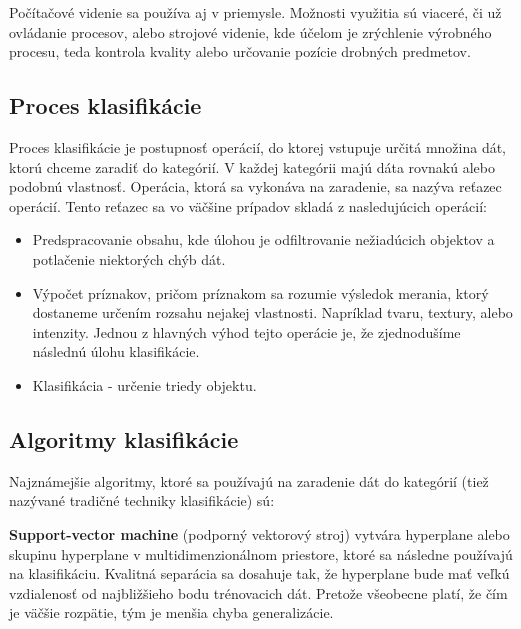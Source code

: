\hspace{10mm}Počítačové videnie sa používa aj v priemysle. Možnosti využitia sú viaceré, či už ovládanie procesov, alebo strojové videnie, kde účelom je zrýchlenie výrobného procesu, teda kontrola kvality alebo určovanie pozície drobných predmetov.\cite{Sikudova2013}  

\subsection{Proces klasifikácie}
\hspace{10mm}Proces klasifikácie je postupnosť operácií, do ktorej vstupuje určitá množina dát, ktorú chceme zaradiť do kategórií. V každej kategórii majú dáta rovnakú alebo podobnú vlastnosť. Operácia, ktorá sa vykonáva na zaradenie, sa nazýva reťazec operácií. Tento reťazec sa vo väčšine prípadov skladá z nasledujúcich operácií:

\begin{itemize}
    \item Predspracovanie obsahu, kde úlohou je odfiltrovanie nežiadúcich objektov a potlačenie niektorých chýb dát.
    \item Výpočet príznakov, pričom príznakom sa rozumie výsledok merania, ktorý dostaneme určením rozsahu nejakej vlastnosti. Napríklad tvaru, textury, alebo intenzity. Jednou z hlavných výhod tejto operácie je, že zjednodušíme následnú úlohu klasifikácie.
    \item Klasifikácia - určenie triedy objektu.
\end{itemize}
\cite{Sikudova2013} 

\subsection{Algoritmy klasifikácie}

\hspace{10mm}Najznámejšie algoritmy, ktoré sa používajú na zaradenie dát do kategórií (tiež nazývané tradičné techniky klasifikácie) sú: 

\hspace{10mm}\textbf{Support-vector machine} (podporný vektorový stroj) vytvára hyperplane alebo skupinu hyperplane v multidimenzionálnom priestore, ktoré sa následne používajú na klasifikáciu. Kvalitná separácia sa dosahuje tak, že hyperplane bude mať veľkú vzdialenosť od najbližšieho bodu trénovacich dát. Pretože všeobecne platí, že čím je väčšie rozpätie, tým je menšia chyba generalizácie. 

